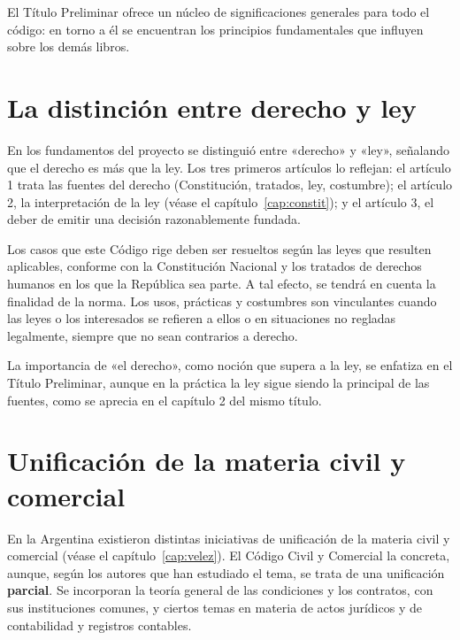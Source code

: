 \documentclass[12pt,oneside]{book}
\begin{document}
\begin{importante}
El Título Preliminar ofrece un núcleo de significaciones generales para todo el código: en torno a él se encuentran los principios fundamentales que influyen sobre los demás libros.
\end{importante}

\section{La distinción entre derecho y ley}

En los fundamentos del proyecto se distinguió entre «derecho» y «ley», señalando que el derecho es más que la ley. Los tres primeros artículos lo reflejan: el artículo 1 trata las fuentes del derecho (Constitución, tratados, ley, costumbre); el artículo 2, la interpretación de la ley (véase el capítulo~\ref{cap:constit}); y el artículo 3, el deber de emitir una decisión razonablemente fundada.

\begin{regla}
Los casos que este Código rige deben ser resueltos según las leyes que resulten aplicables, conforme con la Constitución Nacional y los tratados de derechos humanos en los que la República sea parte. A tal efecto, se tendrá en cuenta la finalidad de la norma. Los usos, prácticas y costumbres son vinculantes cuando las leyes o los interesados se refieren a ellos o en situaciones no regladas legalmente, siempre que no sean contrarios a derecho.
\end{regla}

La importancia de «el derecho», como noción que supera a la ley, se enfatiza en el Título Preliminar, aunque en la práctica la ley sigue siendo la principal de las fuentes, como se aprecia en el capítulo 2 del mismo título.

\section{Unificación de la materia civil y comercial}

En la Argentina existieron distintas iniciativas de unificación de la materia civil y comercial (véase el capítulo~\ref{cap:velez}). El Código Civil y Comercial la concreta, aunque, según los autores que han estudiado el tema, se trata de una unificación \textbf{parcial}. Se incorporan la teoría general de las condiciones y los contratos, con sus instituciones comunes, y ciertos temas en materia de actos jurídicos y de contabilidad y registros contables.
\end{document}
